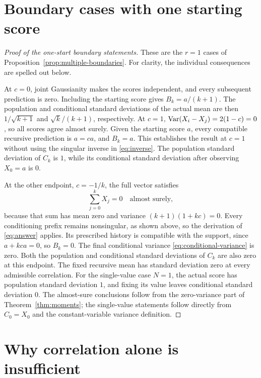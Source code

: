 \chapter{Boundary cases with one starting score}
\begin{proof}[Proof of the one-start boundary statements]
These are the \(r=1\) cases of Proposition~\ref{prop:multiple-boundaries}.
For clarity, the individual consequences are spelled out below.

At \(c=0\), joint Gaussianity makes the scores independent, and every
subsequent prediction is zero. Including the starting score gives
\(B_k=a/(k+1)\). The population and conditional standard deviations of
the actual mean are then \(1/\sqrt{k+1}\) and \(\sqrt{k}/(k+1)\), respectively.
At \(c=1\),
\(\operatorname{Var}(X_i-X_j)=2(1-c)=0\), so all scores agree almost surely. Given
the starting score \(a\), every compatible recursive prediction is
\(a=ca\), and \(B_k=a\). This establishes the result at \(c=1\) without using the
singular inverse in \eqref{eq:inverse}.
The population standard deviation of \(C_k\) is \(1\), while its
conditional standard deviation after observing \(X_0=a\) is \(0\).

At the other endpoint, \(c=-1/k\), the full vector satisfies
\[
  \sum_{j=0}^{k}X_j=0\quad\text{almost surely},
\]
because that sum has mean zero and variance
\((k+1)(1+kc)=0\). Every conditioning prefix remains nonsingular, as
shown above, so the derivation of \eqref{eq:answer} applies. Its prescribed
history is compatible with the support, since
\(a+kca=0\), so \(B_k=0\). The final conditional variance
\eqref{eq:conditional-variance} is zero.
Both the population and conditional standard deviations of \(C_k\) are
also zero at this endpoint. The fixed recursive mean has standard deviation
zero at every admissible correlation. For the single-value case \(N=1\),
the actual score has population standard deviation \(1\), and fixing its
value leaves conditional standard deviation \(0\).
The almost-sure conclusions follow from the zero-variance part of
Theorem~\ref{thm:moments}; the single-value statements follow directly
from \(C_0=X_0\) and the constant-variable variance definition.
\end{proof}

\chapter{Why correlation alone is insufficient}


